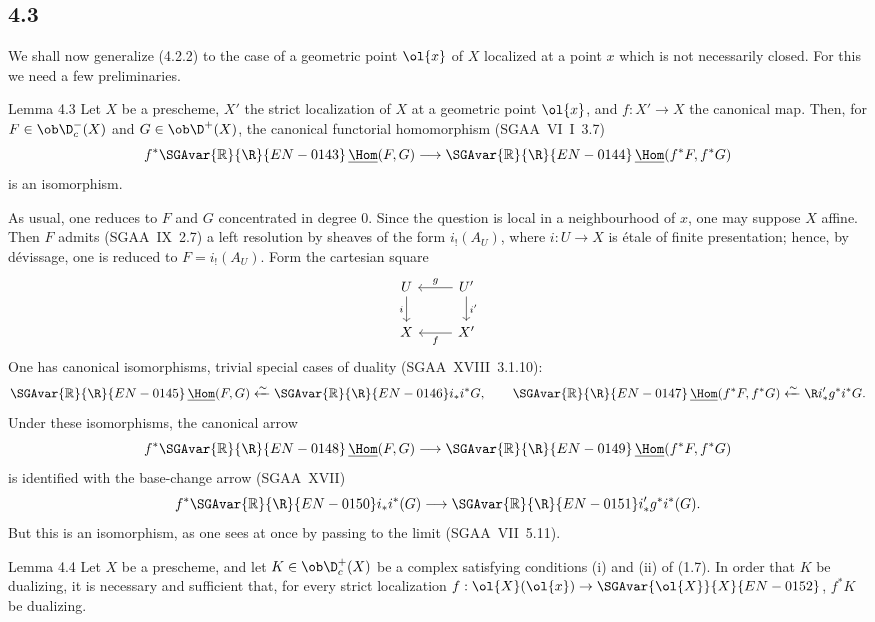 \subsection*{4.3}
We shall now generalize (4.2.2) to the case of a geometric point $\ol{x}$ of $X$ localized at a point $x$ which is not necessarily closed. For this we need a few preliminaries.

\begin{statement}{Lemma 4.3}
Let $X$ be a prescheme, $X'$ the strict localization of $X$ at a geometric point $\ol{x}$, and $f:X'\to X$ the canonical map. Then, for $F\in\ob\D_c^-(X)$ and $G\in\ob\D^+(X)$, the canonical functorial homomorphism (SGAA~VI~I~3.7)
\[
f^*\SGAvar{\mathbb{R}}{\R}{EN-0143}\,\underline{\Hom}(F,G)\longrightarrow \SGAvar{\mathbb{R}}{\R}{EN-0144}\,\underline{\Hom}(f^*F,f^*G)
\]
is an isomorphism.
\end{statement}

\begin{prooftext}[Proof]
As usual, one reduces to $F$ and $G$ concentrated in degree $0$. Since the question is local in a neighbourhood of $x$, one may suppose $X$ affine. Then $F$ admits (SGAA~IX~2.7) a left resolution by sheaves of the form $i_!(A_U)$, where $i:U\to X$ is étale of finite presentation; hence, by dévissage, one is reduced to $F=i_!(A_U)$. Form the cartesian square
\[
\begin{tikzcd}
U \arrow[d,"i"'] & U' \arrow[l,"g"'] \arrow[d,"i'"] \\
X & X' \arrow[l,"f"]
\end{tikzcd}
\]
One has canonical isomorphisms, trivial special cases of duality (SGAA~XVIII~3.1.10):
\[
\SGAvar{\mathbb{R}}{\R}{EN-0145}\,\underline{\Hom}(F,G)\xleftarrow{\sim}\SGAvar{\mathbb{R}}{\R}{EN-0146} i_* i^*G,
\qquad
\SGAvar{\mathbb{R}}{\R}{EN-0147}\,\underline{\Hom}(f^*F,f^*G)\xleftarrow{\sim}\R i'_* g^*i^*G.
\]
Under these isomorphisms, the canonical arrow
\[
f^*\SGAvar{\mathbb{R}}{\R}{EN-0148}\,\underline{\Hom}(F,G)\longrightarrow \SGAvar{\mathbb{R}}{\R}{EN-0149}\,\underline{\Hom}(f^*F,f^*G)
\]
is identified with the base-change arrow (SGAA~XVII)
\[
f^*\SGAvar{\mathbb{R}}{\R}{EN-0150} i_*i^*(G)\longrightarrow \SGAvar{\mathbb{R}}{\R}{EN-0151} i'_*g^*i^*(G).
\]
But this is an isomorphism, as one sees at once by passing to the limit (SGAA~VII~5.11).
\end{prooftext}

\begin{statement}{Lemma 4.4}
Let $X$ be a prescheme, and let $K\in\ob\D_c^+(X)$ be a complex satisfying conditions (i) and (ii) of (1.7). In order that $K$ be dualizing, it is necessary and sufficient that, for every strict localization $f:\ol{X}(\ol{x})\to \SGAvar{\ol{X}}{X}{EN-0152}$, $f^*K$ be dualizing.
\end{statement}

